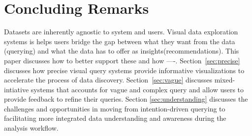 \section{Concluding Remarks\label{sec:conclusion}}
\par Datasets are inherently agnostic to system and users. Visual data exploration systems is helps users bridge the gap between what they want from the data (querying) and what the data has to offer as insights(recommendations). This paper discusses how to better support these and how ----. Section~\ref{sec:precise} discusses how precise visual query systems provide informative visualizations to accelerate the process of data discovery. Section~\ref{sec:vague} discusses mixed-intiative systems that accounts for vague and complex query and allow users to provide feedback to refine their queries. Section \ref{sec:understanding} discusses the challenges and opportunities in moving from intention-driven querying to facilitating more integrated data understanding and awareness during the analysis workflow.



